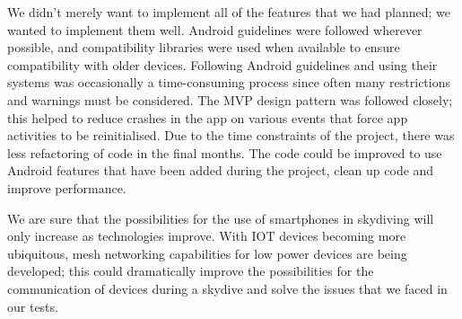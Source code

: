 We didn't merely want to implement all of the features that we had planned; we wanted to implement them well. Android guidelines were followed wherever possible, and compatibility libraries were used when available to ensure compatibility with older devices. Following Android guidelines and using their systems was occasionally a time-consuming process since often many restrictions and warnings must be considered. The MVP design pattern was followed closely; this helped to reduce crashes in the app on various events that force app activities to be reinitialised. Due to the time constraints of the project, there was less refactoring of code in the final months. The code could be improved to use Android features that have been added during the project, clean up code and improve performance.

We are sure that the possibilities for the use of smartphones in skydiving will only increase as technologies improve. With IOT devices becoming more ubiquitous, mesh networking capabilities for low power devices are being developed; this could dramatically improve the possibilities for the communication of devices during a skydive and solve the issues that we faced in our tests.
